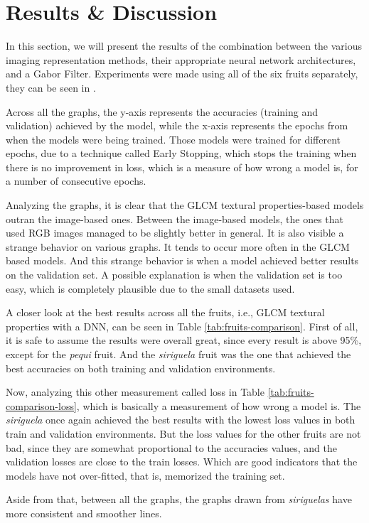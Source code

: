 \documentclass[../main.tex]{subfile}
\begin{document}
\section{Results \& Discussion} \label{sec:results-&-discussion}

In this section, we will present the results of the combination between the various imaging representation methods, their appropriate neural network architectures, and a Gabor Filter. Experiments were made using all of the six fruits separately, they can be seen in .








Across all the graphs, the y-axis represents the accuracies (training and validation) achieved by the model, while the x-axis represents the epochs from when the models were being trained. Those models were trained for different epochs, due to a technique called Early Stopping, which stops the training when there is no improvement in loss, which is a measure of how wrong a model is, for a number of consecutive epochs.

Analyzing the graphs, it is clear that the GLCM textural properties-based models outran the image-based ones. Between the image-based models, the ones that used RGB images managed to be slightly better in general. It is also visible a strange behavior on various graphs. It tends to occur more often in the GLCM based models. And this strange behavior is when a model achieved better results on the validation set. A possible explanation is when the validation set is too easy, which is completely plausible due to the small datasets used.



A closer look at the best results across all the fruits, i.e., GLCM textural properties with a DNN, can be seen in Table \ref{tab:fruits-comparison}. First of all, it is safe to assume the results were overall great, since every result is above 95\%, except for the \textit{pequi} fruit. And the \textit{siriguela} fruit was the one that achieved the best accuracies on both training and validation environments.



Now, analyzing this other measurement called loss in Table \ref{tab:fruits-comparison-loss}, which is basically a measurement of how wrong a model is. The \textit{siriguela} once again achieved the best results with the lowest loss values in both train and validation environments. But the loss values for the other fruits are not bad, since they are somewhat proportional to the accuracies values, and the validation losses are close to the train losses. Which are good indicators that the models have not over-fitted, that is, memorized the training set.

Aside from that, between all the graphs, the graphs drawn from \textit{siriguelas} have more consistent and smoother lines.
\end{document}
